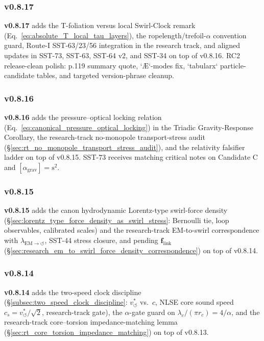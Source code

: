 \documentclass[11pt]{article}
\theoremstyle{definition}
\theoremstyle{plain}
\theoremstyle{remark}
\newcommand{\rc}{{r_c}}
\newcommand{\vchar}{v_{\!\boldsymbol{\circlearrowleft}}^{\ast}}
\begin{document}
        \subsubsection{v0.8.17}
            \textbf{v0.8.17} adds the T-foliation versus local Swirl-Clock remark (Eq.~\ref{eq:absolute_T_local_tau_layers}), the ropelength/trefoil-$\alpha$ convention guard, Route-I SST-63/23/56 integration in the research track, and aligned updates in SST-73, SST-63, SST-64 v2, and SST-34 on top of v0.8.16. RC2 release-clean polish: p.119 summary quote, `\AE{}`-modes fix, `tabularx` particle-candidate tables, and targeted version-phrase cleanup.

        \subsubsection{v0.8.16}
            \textbf{v0.8.16} adds the pressure--optical locking relation (Eq.~\ref{eq:canonical_pressure_optical_locking}) in the Triadic Gravity-Response Corollary, the research-track no-monopole transport-stress audit (\S\ref{sec:rt_no_monopole_transport_stress_audit}), and the relativity falsifier ladder on top of v0.8.15. SST-73 receives matching critical notes on Candidate C and $[\alpha_{\mathrm{grav}}]=\mathrm{s^2}$.

        \subsubsection{v0.8.15}
            \textbf{v0.8.15} adds the canon hydrodynamic Lorentz-type swirl-force density (\S\ref{sec:lorentz_type_force_density_as_swirl_stress}: Bernoulli tie, loop observables, calibrated scales) and the research-track EM-to-swirl correspondence with $\lambda_{\mathrm{EM}\to\circlearrowleft}$, SST-44 stress closure, and pending $\mathbf f_{\mathrm{link}}$ (\S\ref{sec:research_em_to_swirl_force_density_correspondence}) on top of v0.8.14.

        \subsubsection{v0.8.14}
            \textbf{v0.8.14} adds the two-speed clock discipline (\S\ref{subsec:two_speed_clock_discipline}: $\vchar$ vs.\ $c$, NLSE core sound speed $c_s=\vchar/\sqrt{2}$, research-track gate), the $\alpha$-gate guard on $\lambda_c/(\pi\rc)=4/\alpha$, and the research-track core--torsion impedance-matching lemma (\S\ref{sec:rt_core_torsion_impedance_matching}) on top of v0.8.13.
\end{document}
